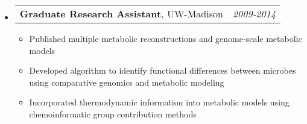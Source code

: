 \documentclass[letterpaper,10pt]{article}
\makeatletter
\newcommand{\ressubheadingSingular}[2]{
\begin{tabular*}{7in}{l@{\cftdotfill{\cftsecdotsep}\extracolsep{\fill}}r}
		#1 & \textit{#2} \\
\end{tabular*}\vspace{-6pt}}
\makeatother
\begin{document}
\begin{itemize}
\begin{itemize}
		\end{itemize}
	\item
		\ressubheadingSingular{\textbf{Graduate Research Assistant}, UW-Madison}{2009-2014}		
		\begin{itemize}
			\item Published multiple metabolic reconstructions and genome-scale metabolic models
			\item Developed algorithm to identify functional differences between microbes using comparative genomics and metabolic modeling
			\item Incorporated thermodynamic information into metabolic models using chemoinformatic group contribution methods
		\end{itemize}
\end{itemize}

\newpage
\end{document}
